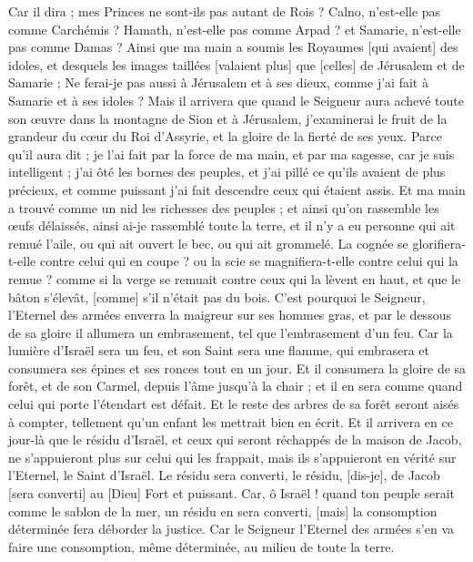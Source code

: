 \begin{multicols}{2}
Car il dira ; mes Princes ne sont-ils pas autant de Rois ?
Calno, n'est-elle pas comme Carchémis ? Hamath, n'est-elle pas comme Arpad ? et Samarie, n'est-elle pas comme Damas ?
Ainsi que ma main a soumis les Royaumes [qui avaient] des idoles, et desquels les images taillées [valaient plus] que [celles] de Jérusalem et de Samarie ;
Ne ferai-je pas aussi à Jérusalem et à ses dieux, comme j'ai fait à Samarie et à ses idoles ?
Mais il arrivera que quand le Seigneur aura achevé toute son œuvre dans la montagne de Sion et à Jérusalem, j'examinerai le fruit de la grandeur du cœur du Roi d'Assyrie, et la gloire de la fierté de ses yeux.
Parce qu'il aura dit ; je l'ai fait par la force de ma main, et par ma sagesse, car je suis intelligent ; j'ai ôté les bornes des peuples, et j'ai pillé ce qu'ils avaient de plus précieux, et comme puissant j'ai fait descendre ceux qui étaient assis.
Et ma main a trouvé comme un nid les richesses des peuples ; et ainsi qu'on rassemble les œufs délaissés, ainsi ai-je rassemblé toute la terre, et il n'y a eu personne qui ait remué l'aile, ou qui ait ouvert le bec, ou qui ait grommelé.
La cognée se glorifiera-t-elle contre celui qui en coupe ? ou la scie se magnifiera-t-elle contre celui qui la remue ? comme si la verge se remuait contre ceux qui la lèvent en haut, et que le bâton s'élevât, [comme] s'il n'était pas du bois.
C'est pourquoi le Seigneur, l'Eternel des armées enverra la maigreur sur ses hommes gras, et par le dessous de sa gloire il allumera un embrasement, tel que l'embrasement d'un feu.
Car la lumière d'Israël sera un feu, et son Saint sera une flamme, qui embrasera et consumera ses épines et ses ronces tout en un jour.
Et il consumera la gloire de sa forêt, et de son Carmel, depuis l'âme jusqu'à la chair ; et il en sera comme quand celui qui porte l'étendart est défait.
Et le reste des arbres de sa forêt seront aisés à compter, tellement qu'un enfant les mettrait bien en écrit.
Et il arrivera en ce jour-là que le résidu d'Israël, et ceux qui seront réchappés de la maison de Jacob, ne s'appuieront plus sur celui qui les frappait, mais ils s'appuieront en vérité sur l'Eternel, le Saint d'Israël.
Le résidu sera converti, le résidu, [dis-je], de Jacob [sera converti] au [Dieu] Fort et puissant.
Car, ô Israël ! quand ton peuple serait comme le sablon de la mer, un résidu en sera converti, [mais] la consomption déterminée fera déborder la justice.
Car le Seigneur l'Eternel des armées s'en va faire une consomption, même déterminée, au milieu de toute la terre.

\end{multicols}
